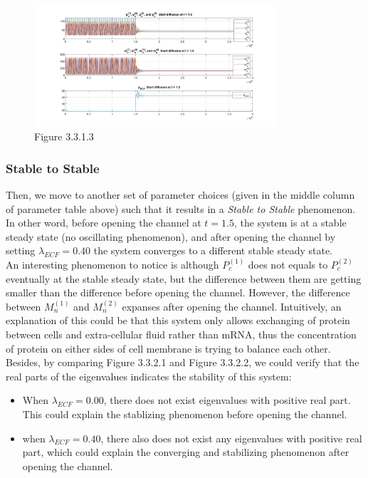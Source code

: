 \documentclass[12pt]{article}
\renewcommand{\(}{\left (}
\renewcommand{\)}{\right )}
\begin{document}
\begin{figure}[h!]
    \centering
	\begin{minipage}{0.99\textwidth}
		\centering
		\includegraphics[width=0.8\textwidth]{US_M.jpg}
		\caption*{\small Figure 3.3.1.3}
	\end{minipage}
\end{figure}

\subsubsection{Stable to Stable}
\hspace{5mm} Then, we move to another set of parameter choices (given in the middle column of parameter table above) such that it results in a \textit{Stable to Stable} phenomenon. In other word, before opening the channel at $t = 1.5$, the system is at a stable steady state (no oscillating phenomenon), and after opening the channel by setting $\lambda_{ECF} = 0.40$ the system converges to a different stable steady state. \\

An interesting phenomenon to notice is although $P_{c}^{(1)}$ does not equals to $P_{c}^{(2)}$ eventually at the stable steady state, but the difference between them are getting smaller than the difference before opening the channel. However, the difference between $M_{n}^{(1)}$ and $M_{n}^{(2)}$ expanses after opening the channel. Intuitively, an explanation of this could be that this system only allows exchanging of protein between cells and extra-cellular fluid rather than mRNA, thus the concentration of protein on either sides of cell membrane is trying to balance each other. \\

Besides, by comparing Figure 3.3.2.1 and Figure 3.3.2.2, we could verify that the real parts of the eigenvalues indicates the stability of this system: \\
\begin{itemize}
    \item When $\lambda_{ECF} = 0.00$, there does not exist eigenvalues with positive real part. This could explain the stablizing phenomenon before opening the channel.
    \item when $\lambda_{ECF} = 0.40$, there also does not exist any eigenvalues with positive real part, which could explain the converging and stabilizing phenomenon after opening the channel.
\end{itemize}
\end{document}
